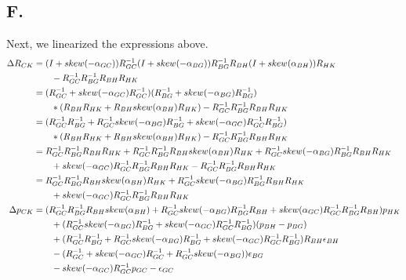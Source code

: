 \documentclass[letterpaper, 11pt]{article}
\begin{document}
\subsection*{F.}
Next, we linearized the expressions above.
\begin{align}
	\Delta R_{CK} &= (I + skew(-\alpha_{GC}))R_{GC}^{-1}(I + skew(-\alpha_{BG}))R_{BG}^{-1}R_{BH}(I +skew(\alpha_{BH}))R_{HK} \notag \\ 
    & \qquad - R_{GC}^{-1}R_{BG}^{-1}R_{BH}R_{HK} \\
    &= (R_{GC}^{-1} + skew(-\alpha_{GC})R_{GC}^{-1})(R_{BG}^{-1} + skew(-\alpha_{BG})R_{BG}^{-1}) \notag \\ 
    & \qquad * (R_{BH}R_{HK} + R_{BH}skew(\alpha_{BH})R_{HK}) - R_{GC}^{-1}R_{BG}^{-1}R_{BH}R_{HK} \\
    &= (R_{GC}^{-1}R_{BG}^{-1} + R_{GC}^{-1}skew(-\alpha_{BG})R_{BG}^{-1} + skew(-\alpha_{GC})R_{GC}^{-1}R_{BG}^{-1}) \notag \\ 
    & \qquad * (R_{BH}R_{HK} + R_{BH}skew(\alpha_{BH})R_{HK}) -R_{GC}^{-1}R_{BG}^{-1}R_{BH}R_{HK} \\
    &= R_{GC}^{-1}R_{BG}^{-1}R_{BH}R_{HK} + R_{GC}^{-1}R_{BG}^{-1}R_{BH}skew(\alpha_{BH})R_{HK} + R_{GC}^{-1}skew(-\alpha_{BG})R_{BG}^{-1}R_{BH}R_{HK}  \notag \\ 
    & \qquad + skew(-\alpha_{GC})R_{GC}^{-1}R_{BG}^{-1}R_{BH}R_{HK} -  R_{GC}^{-1}R_{BG}^{-1}R_{BH}R_{HK} \\
    &= R_{GC}^{-1}R_{BG}^{-1}R_{BH}skew(\alpha_{BH})R_{HK} + R_{GC}^{-1}skew(-\alpha_{BG})R_{BG}^{-1}R_{BH}R_{HK} \notag \\
    & \qquad + skew(-\alpha_{GC})R_{GC}^{-1}R_{BG}^{-1}R_{BH}R_{HK} \\
	\Delta p_{CK} &= (R_{GC}^{-1}R_{BG}^{-1}R_{BH}skew(\alpha_{BH}) + R_{GC}^{-1}skew(-\alpha_{BG})R_{BG}^{-1}R_{BH} + skew(\alpha_{GC})R_{GC}^{-1}R_{BG}^{-1}R_{BH})p_{HK}  \notag \\ 
    & \qquad  +  (R_{GC}^{-1}skew(-\alpha_{BG})R_{BG}^{-1} + skew(-\alpha_{GC})R_{GC}^{-1}R_{BG}^{-1})(p_{BH} - p_{BG})  \notag \\ 
    & \qquad  + (R_{GC}^{-1}R_{BG}^{-1} + R_{GC}^{-1}skew(-\alpha_{BG})R_{BG}^{-1} + skew(-\alpha_{GC})R_{GC}^{-1}R_{BG}^{-1})R_{BH}\epsilon_{BH} \notag \\ 
    & \qquad  - (R_{GC}^{-1} + skew(-\alpha_{GC})R_{GC}^{-1} + R_{GC}^{-1}skew(-\alpha_{BG}))\epsilon_{BG} \notag \\ 
    & \qquad  - skew(-\alpha_{GC})R_{GC}^{-1}p_{GC} - \epsilon_{GC}
\end{align}
\end{document}
